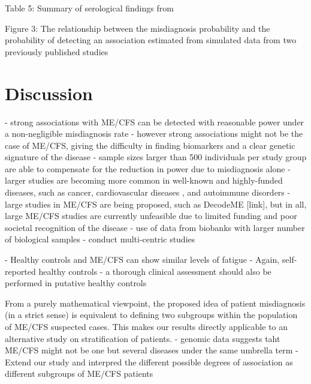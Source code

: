 Table 5: Summary of serological findings from \citet{cliff2019CellularImmune}


Figure 3: The relationship between the misdiagnosis probability and the probability of detecting an association estimated from simulated data from two previously published studies

\section{Discussion}

- strong associations with ME/CFS can be detected with reasonable power under a non-negligible misdiagnosis rate
- however strong associations might not be the case of ME/CFS, giving the difficulty in finding biomarkers \citep{scheibenbogen2017EuropeanME} and a clear genetic signature of the disease \citep{dibble2020GeneticRisk, hajdarevic2022GeneticAssociation, herrera2018GenomeepigenomeInteractions, tanigawa2019ComponentsGenetic}
- sample sizes larger than 500 individuals per study group are able to compensate for the reduction in power due to misdiagnosis alone
- larger studies are becoming more common in well-known and highly-funded diseases, such as cancer, cardiovascular diseases \citep{giri2019TransethnicAssociation}, and autoimmune disorders \citep{bjornevik2022LongitudinalAnalysis, internationalmultiplesclerosisgeneticsconsortiumimsgc2013AnalysisImmunerelated}
- large studies in ME/CFS are being proposed, such as DecodeME [link], but in all, large ME/CFS studies are currently unfeasible due to limited funding and poor societal recognition of the disease \citep{pheby2021LiteratureReview}
- use of data from biobanks with larger number of biological samples \citep{lacerda2018UKME}
- conduct multi-centric studies \citep{scheibenbogen2017EuropeanME}

- Healthy controls and ME/CFS can show similar levels of fatigue \citep{cella2010MeasuringFatigue, malato2021Statisticalchallenges}
- Again, self-reported healthy controls
    - a thorough clinical assessment should also be performed in putative healthy controls

From a purely mathematical viewpoint, the proposed idea of patient misdiagnosis (in a strict sense) is equivalent to defining two subgroups within the population of ME/CFS suspected cases. This makes our results directly applicable to an alternative study on stratification of patients.
- genomic data suggests taht ME/CFS might not be one but several diseases under the same umbrella term \citep{kerr2008GeneExpression, zhang2010MicrobialInfections}
- Extend our study and interpred the different possible degrees of association as different subgroups of ME/CFS patients

